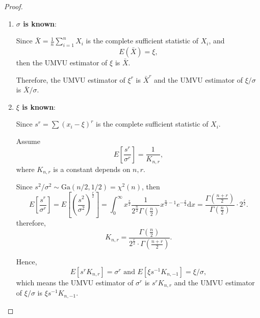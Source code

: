\begin{proof}
    \begin{enumerate}
        \item \textbf{$\sigma$ is known}:

              Since $\bar{X}=\frac{1}{n}\sum_{i=1}^{n}X_i$ is the complete sufficient statistic of $X_i$, and
              \begin{equation*}
                  E(\bar{X})=\xi,
              \end{equation*}
              then the UMVU estimator of $\xi$ is $\bar{X}$.

              Therefore, the UMVU estimator of $\xi^r$ is $\bar{X}^r$ and the UMVU estimator of $\xi/\sigma$ is $\bar{X}/\sigma$.

        \item \textbf{$\xi$ is known}:

              Since $s^r=\sum\left(x_{i}-\xi\right)^r$ is the complete sufficient statistic of $X_i$.

              Assume
              \begin{equation*}
                  E\left[\frac{s^r}{\sigma^r}\right]=\frac{1}{K_{n,r}},
              \end{equation*}
              where $K_{n,r}$ is a constant depends on $n,r$.

              Since $s^2/\sigma^2\sim\text{Ga}(n/2,1/2)=\chi^2(n)$, then
              \begin{equation*}
                  E\left[\frac{s^r}{\sigma^r}\right]=E\left[\left(\frac{s^2}{\sigma^2}\right)^{\frac{r}{2}}\right]=\int_{0}^{\infty}x^{\frac{r}{2}}\frac{1}{2^{\frac{n}{2}}\Gamma(\frac{n}{2})}x^{\frac{n}{2}-1}e^{-\frac{x}{2}}\mathrm{d}x=\frac{\Gamma\left(\frac{n+r}{2}\right)}{\Gamma(\frac{n}{2})}\cdot 2^{\frac{r}{2}}.
              \end{equation*}
              therefore,
              \begin{equation*}
                  K_{n,r}=\frac{\Gamma(\frac{n}{2})}{2^{\frac{r}{2}}\cdot\Gamma\left(\frac{n+r}{2}\right)}.
              \end{equation*}

              Hence,
              \begin{equation*}
                  E\left[s^rK_{n,r}\right]=\sigma^r \text{ and } E[\xi s^{-1}K_{n,-1}]=\xi/\sigma,
              \end{equation*}
              which means the UMVU estimator of $\sigma^r$ is $s^rK_{n,r}$ and the UMVU estimator of $\xi/\sigma$ is $\xi s^{-1}K_{n,-1}$.


\end{enumerate}
\end{proof}
